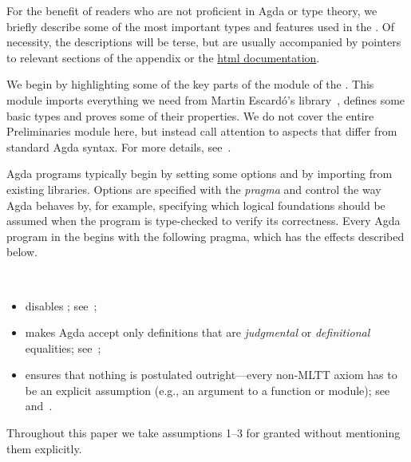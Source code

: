 \documentclass[a4paper,UKenglish,cleveref,autoref,thm-restate,11pt]{lipics-v2021}
\begin{document}
For the benefit of readers who are not proficient in Agda or type theory, we briefly describe some of the most important types and features used in the \ualib.  Of necessity, the descriptions will be terse, but are usually accompanied by pointers to relevant sections of the appendix or the \href{https://ualib.gitlab.io}{html documentation}.

We begin by highlighting some of the key parts of the \ualibPreliminaries module of the \ualib. This module imports everything we need from Martin Escard\'o's \typetopology library~\cite{MHE}, defines some basic types and proves some of their properties.  We do not cover the entire Preliminaries module here, but instead call attention to aspects that differ from standard Agda syntax. For more details, see~\cite[\S2]{DeMeo:2021}.

Agda programs typically begin by setting some options and by importing from existing libraries.
Options are specified with the  \emph{pragma} and control the way Agda behaves by, for example, specifying which logical foundations should be assumed when the program is type-checked to verify its correctness. 
Every Agda program in the \ualib begins with the following pragma, which has the effects described below.
\ccpad
\begin{code}[number=code:options]
\>[0]\AgdaSymbol{\{-\#}\AgdaSpace{}%
\AgdaSpace{}%
\AgdaSpace{}%
\AgdaSpace{}%
\AgdaSpace{}%
\AgdaSymbol{\#-\}}\<%
\end{code}
\\[-20pt]
\begin{itemize}
\item {} disables \axiomk; see~\cite{agdaref-axiomk};
\item {} makes Agda accept only definitions that are \emph{judgmental} or \emph{definitional} equalities; see~\cite{agdatools-patternmatching};
\item {} ensures that nothing is postulated outright---every non-MLTT axiom has to be an explicit assumption (e.g., an argument to a function or module); see~\cite{agdaref-safeagda} and~\cite{agdatools-patternmatching}.
\end{itemize}
Throughout this paper we take assumptions 1--3 for granted without mentioning them explicitly.
\end{document}
